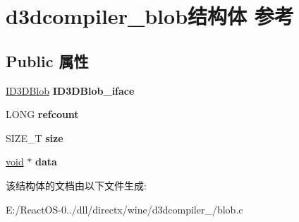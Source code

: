 \hypertarget{structd3dcompiler__blob}{}\section{d3dcompiler\+\_\+blob结构体 参考}
\label{structd3dcompiler__blob}
\subsection*{Public 属性}
\begin{DoxyCompactItemize}
\item 
\mbox{\label{structd3dcompiler__blob_ad1f4531fed04622be55139d9b0440ff3}} 
\hyperlink{interface_i_d3_d10_blob}{I\+D3\+D\+Blob} {\bfseries I\+D3\+D\+Blob\+\_\+iface}
\item 
\mbox{\label{structd3dcompiler__blob_a38903ff337f9836affd0ca47ae7d1811}} 
L\+O\+NG {\bfseries refcount}
\item 
\mbox{\label{structd3dcompiler__blob_acf472281e02f2cb6e1ee22241ec87433}} 
S\+I\+Z\+E\+\_\+T {\bfseries size}
\item 
\mbox{\label{structd3dcompiler__blob_a78cd16b17d5b50c7a4f8bcd6ccfd0f10}} 
\hyperlink{interfacevoid}{void} $\ast$ {\bfseries data}
\end{DoxyCompactItemize}


该结构体的文档由以下文件生成\+:\begin{DoxyCompactItemize}
\item 
E\+:/\+React\+O\+S-\/0../dll/directx/wine/d3dcompiler\+\_/blob.\+c\end{DoxyCompactItemize}
